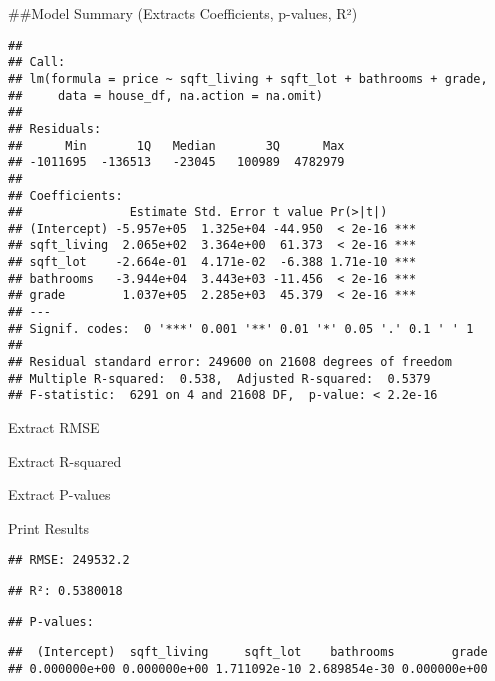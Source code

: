 \documentclass[
  ignorenonframetext,
]{beamer}
\begin{document}
\begin{frame}[fragile]{}
\label{section-4}
\#\#Model Summary (Extracts Coefficients, p-values, R²)

\begin{verbatim}
## 
## Call:
## lm(formula = price ~ sqft_living + sqft_lot + bathrooms + grade, 
##     data = house_df, na.action = na.omit)
## 
## Residuals:
##      Min       1Q   Median       3Q      Max 
## -1011695  -136513   -23045   100989  4782979 
## 
## Coefficients:
##               Estimate Std. Error t value Pr(>|t|)    
## (Intercept) -5.957e+05  1.325e+04 -44.950  < 2e-16 ***
## sqft_living  2.065e+02  3.364e+00  61.373  < 2e-16 ***
## sqft_lot    -2.664e-01  4.171e-02  -6.388 1.71e-10 ***
## bathrooms   -3.944e+04  3.443e+03 -11.456  < 2e-16 ***
## grade        1.037e+05  2.285e+03  45.379  < 2e-16 ***
## ---
## Signif. codes:  0 '***' 0.001 '**' 0.01 '*' 0.05 '.' 0.1 ' ' 1
## 
## Residual standard error: 249600 on 21608 degrees of freedom
## Multiple R-squared:  0.538,  Adjusted R-squared:  0.5379 
## F-statistic:  6291 on 4 and 21608 DF,  p-value: < 2.2e-16
\end{verbatim}
\end{frame}

\begin{frame}{}
\label{section-5}
\end{frame}

\begin{frame}{Extract RMSE}
\label{extract-rmse}
\end{frame}

\begin{frame}{Extract R-squared}
\label{extract-r-squared}
\end{frame}

\begin{frame}{Extract P-values}
\label{extract-p-values}
\end{frame}

\begin{frame}[fragile]{Print Results}
\label{print-results}
\begin{verbatim}
## RMSE: 249532.2
\end{verbatim}

\begin{verbatim}
## R²: 0.5380018
\end{verbatim}

\begin{verbatim}
## P-values:
\end{verbatim}

\begin{verbatim}
##  (Intercept)  sqft_living     sqft_lot    bathrooms        grade 
## 0.000000e+00 0.000000e+00 1.711092e-10 2.689854e-30 0.000000e+00
\end{verbatim}
\end{frame}
\end{document}
